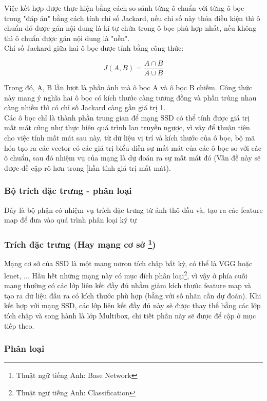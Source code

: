 \documentclass[a4paper,12pt]{article}
\begin{document}
	Việc kết hợp được thực hiện bằng cách so sánh từng ô chuẩn với từng ô bọc trong "đáp án" bằng cách tính chỉ số Jackard, nếu chỉ số này thỏa điều kiện thì ô chuẩn đó được gán nội dung là kí tự chứa trong ô bọc phù hợp nhất, nếu không thì ô chuẩn được gán nội dung là "nền".\\
	
	Chỉ số Jackard giữa hai ô bọc được tính bằng công thức:
	
	$$  J(A, B) = \frac{A \cap B }{ A \cup B } $$
	
	Trong đó, A, B lần lượt là phần ảnh mà ô bọc A và ô bọc B chiếm. Công thức này mang ý nghĩa hai ô bọc có kích thước càng tương đồng và phần trùng nhau càng nhiều thì có chỉ số Jackard càng gần giá trị 1.\\
	
	Các ô bọc chỉ là thành phần trung gian để mạng SSD có thể tính được giá trị mất mát cũng như thực hiện quá trình lan truyền ngược, vì vậy để thuận tiện cho việc tính mất mát sau này, từ dữ liệu vị trí và kích thước của ô bọc, bộ mã hóa tạo ra các vector có các giá trị biểu diễn sự mất mát của các ô bọc so với các ô chuẩn, sau đó nhiệm vụ của mạng là dự đoán ra sự mất mát đó (Vấn đề này sẽ được đề cập rõ hơn trong [hần tính giá trị mất mát).
	
	\subsubsection{Bộ trích đặc trưng - phân loại}
	Đây là bộ phận có nhiệm vụ trích đặc trưng từ ảnh thô đầu và, tạo ra các feature map để đưa vào quá trình phân loại ký tự
	
	\subsubsection*{Trích đặc trưng (Hay mạng cơ sở \footnote{Thuật ngữ tiếng Anh: Base Network})}
	
	Mạng cơ sở của SSD là một mạng nơron tích chập bất kỳ, có thể là VGG hoặc lenet, ... Hầu hết những mạng này có mục đích phân loại\footnote{Thuật ngữ tiếng Anh: Classification}, vì vậy ở phía cuối mạng thường có các lớp liên kết đầy đủ nhằm giảm kích thước feature map và tạo ra dữ liệu đầu ra có kích thước phù hợp (bằng với số nhãn cần dự đoán). Khi kết hợp với mạng SSD, các lớp liên kết đầy đủ này sẽ được thay thế bằng các lớp tích chập và song hành là lớp Multibox, chi tiết phần này sẽ được để cập ở mục tiếp theo.
	
	\subsubsection* {Phân loại}
	
\end{document}
